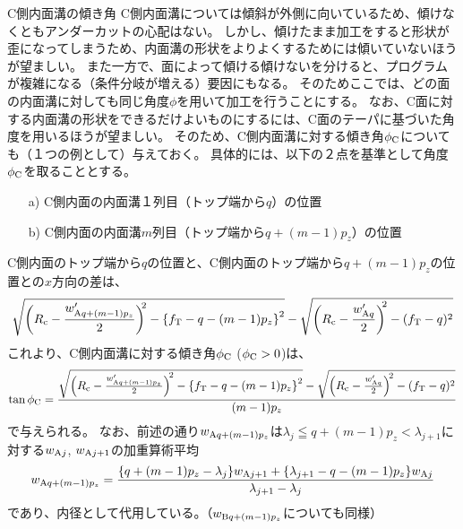 \begin{Column}{C側内面溝の傾き角}
C側内面溝については傾斜が外側に向いているため、傾けなくともアンダーカットの心配はない。
しかし、傾けたまま加工をすると形状が歪になってしまうため、内面溝の形状をよりよくするためには傾いていないほうが望ましい。
また一方で、面によって傾ける傾けないを分けると、プログラムが複雑になる（条件分岐が増える）要因にもなる。
そのためここでは、どの面の内面溝に対しても同じ角度$\phi$を用いて加工を行うことにする。
\tcbline*
なお、C面に対する内面溝の形状をできるだけよいものにするには、C面のテーパに基づいた角度を用いるほうが望ましい。
そのため、C側内面溝に対する傾き角$\phi_\text C$についても（１つの例として）与えておく。
具体的には、以下の２点を基準として角度$\phi_\text C$を取ることとする。
\begin{enumerate}
\item[a)]
C側内面の内面溝１列目（トップ端から$q$）の位置
\item[b)]
C側内面の内面溝$m$列目（トップ端から$q+(m-1)p_z$）の位置
\end{enumerate}
C側内面のトップ端から$q$の位置と、C側内面のトップ端から$q+(m-1)p_z$の位置との$x$方向の差は、
\begin{align*}
  \sqrt{\bigg(R_\text c-\frac{w'_{\text Aq+(m-1)p_z}}2\bigg)^{\!\!2}-\left\{f_\text T-q-(m-1)p_z\right\}^2}
  -\sqrt{\left(R_\text c-\frac{w'_{\text Aq}}2\right)^{\!\!2}-(f_\text T-q)^2}
\end{align*}
これより、C側内面溝に対する傾き角$\phi_\text C$ ($\phi_\text C > 0$)は、
\begin{align*}
  \tan\phi_\text C
  = \frac{\sqrt{\left(R_\text c-\frac{w'_{\text Aq+(m-1)p_z}}2\right)^{\!2}-\left\{f_\text T-q-(m-1)p_z\right\}^2}
          -\sqrt{\left(R_\text c-\frac{w'_{\text Aq}}2\right)^{\!2}-(f_\text T-q)^2}}
         {(m-1)p_z}
\end{align*}
で与えられる。
なお、前述の通り$w_{\text Aq+(m-1)p_z}$は$\lambda_j \leqq q+(m-1)p_z < \lambda_{j+1}$に対する$w_{\text Aj}$, $w_{\text Aj+1}$の加重算術平均
\begin{align*}
  w_{\text Aq+(m-1)p_z}
  = \frac{\{q+(m-1)p_z-\lambda_j\}w_{\text Aj+1}+\{\lambda_{j+1}-q-(m-1)p_z\}w_{\text Aj}}
         {\lambda_{j+1}-\lambda_j}
\end{align*}
であり、内径として代用している。（$w_{\text Bq+(m-1)p_z}$についても同様）
\end{Column}





